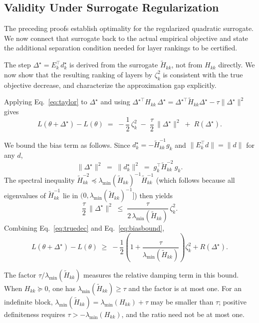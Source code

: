 \documentclass[accepted]{uai2026}%
\theoremstyle{remark}%
\begin{document}
\subsection{Validity Under Surrogate Regularization}
\label{sec:bias}

The preceding proofs establish optimality for the regularized quadratic
surrogate. We now connect that surrogate back to the actual empirical
objective and state the additional separation condition needed for layer
rankings to be certified.

The step $\Delta^{\star} = E_k^{\top}d_k^{\star}$ is derived from the surrogate
$\widetilde{H}_{kk}$, not from $H_{kk}$ directly.
We now show that the resulting ranking of layers by $\zeta_k^2$ is consistent
with the true objective decrease, and characterize the approximation gap explicitly.

Applying Eq.~\eqref{eq:taylor} to $\Delta^{\star}$ and using
$\Delta^{\star\top} H_{kk}\,\Delta^{\star}
 = \Delta^{\star\top}\widetilde{H}_{kk}\Delta^{\star} - \tau\|\Delta^{\star}\|^{2}$
gives
\begin{equation}
  \label{eq:truedec}
  L(\theta + \Delta^{\star}) - L(\theta)
  \;=\;
  -\frac{1}{2}\,\zeta_k^{2}
  \;-\;
  \frac{\tau}{2}\,\|\Delta^{\star}\|^{2}
  \;+\;
  R(\Delta^{\star}).
\end{equation}

\noindent
We bound the bias term as follows.
Since $d_k^{\star} = -\widetilde{H}_{kk}^{-1}g_k$ and
$\|E_k^{\top}d\| = \|d\|$ for any $d$,
\[
  \|\Delta^{\star}\|^{2}
  \;=\;
  \|d_k^{\star}\|^{2}
  \;=\;
  g_k^{\top}\widetilde{H}_{kk}^{-2}\,g_k.
\]
The spectral inequality $\widetilde{H}_{kk}^{-2} \preceq \lambda_{\min}(\widetilde{H}_{kk})^{-1}\widetilde{H}_{kk}^{-1}$
(which follows because all eigenvalues of $\widetilde{H}_{kk}^{-1}$ lie in
$(0,\lambda_{\min}(\widetilde H_{kk})^{-1}]$) then yields
\begin{equation}
  \label{eq:biasbound}
  \frac{\tau}{2}\,\|\Delta^{\star}\|^{2}
  \;\le\;
  \frac{\tau}{2\,\lambda_{\min}(\widetilde{H}_{kk})}\,\zeta_k^{2}.
\end{equation}
Combining Eq.~\eqref{eq:truedec} and Eq.~\eqref{eq:biasbound},
\[
  L(\theta + \Delta^{\star}) - L(\theta)
  \;\ge\;
  -\frac{1}{2}\left(1 + \frac{\tau}{\lambda_{\min}(\widetilde{H}_{kk})}\right)\zeta_k^{2}
  + R(\Delta^{\star}).
\]

The factor
$\tau/\lambda_{\min}(\widetilde H_{kk})$ measures the relative damping term
in this bound. When $H_{kk}\succeq0$, one has
$\lambda_{\min}(\widetilde H_{kk})\ge\tau$ and the factor is at most one.
For an indefinite block,
$\lambda_{\min}(\widetilde H_{kk})=\lambda_{\min}(H_{kk})+\tau$ may be
smaller than $\tau$; positive definiteness requires
$\tau>-\lambda_{\min}(H_{kk})$, and the ratio need not be at most one.
\end{document}

